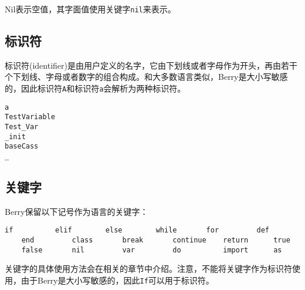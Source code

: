 Nil表示空值，其字面值使用关键字\texttt{nil}来表示。

\subsection{标识符} \label{section:identifier}

标识符(identifier)是由用户定义的名字，它由下划线或者字母作为开头，再由若干个下划线、字母或者数字的组合构成。和大多数语言类似，Berry是大小写敏感的，因此标识符\texttt{A}和标识符\texttt{a}会解析为两种标识符。
\begin{lstlisting}[language=berry, numbers=none]
a
TestVariable
Test_Var
_init
baseCass
_
\end{lstlisting}

\subsection{关键字}

Berry保留以下记号作为语言的关键字：
\begin{lstlisting}[language=berry, numbers=none]
    if          elif        else        while       for         def
    end         class       break       continue    return      true
    false       nil         var         do          import      as
\end{lstlisting}

关键字的具体使用方法会在相关的章节中介绍。注意，不能将关键字作为标识符使用，由于Berry是大小写敏感的，因此\texttt{If}可以用于标识符。
